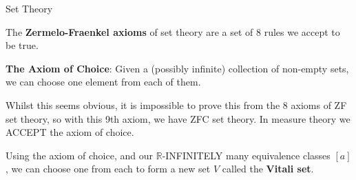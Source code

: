 \documentclass[9pt]{beamer}
\begin{document}
    \begin{frame}{Set Theory}

        The \textbf{Zermelo-Fraenkel axioms} of set theory are a set of $8$ rules we accept to be true.

        \pause

        \vspace{24pt}

        \textbf{The Axiom of Choice}: Given a (possibly infinite) collection of non-empty sets, we can choose one element from each of them.

        \pause

        \vspace{24pt}

        Whilst this seems obvious, it is impossible to prove this from the $8$ axioms of ZF set theory, so with this 9th axiom, we have ZFC set theory.
        In measure theory we ACCEPT the axiom of choice.

        \pause

        \vspace{24pt}

        Using the axiom of choice, and our $\mathbb{R}$-INFINITELY many equivalence classes $[a]$, we can choose one from each to form a new set $V$ called the \textbf{Vitali set}.
        
    \end{frame}
\end{document}
